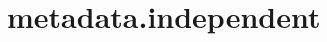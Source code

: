 \section{metadata.independent}
\label{configuration:MetadataIndependent}
\AvailableInJavaAndCsharp{\TODO}